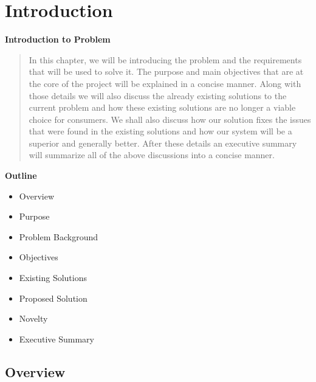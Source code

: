 \section{Introduction}

\vspace{20mm}

\Huge{\textbf{Introduction to Problem}}

\vspace{20mm}


\begin{abstract}
	In this chapter, we will be introducing the problem and the requirements that will be used to solve it. The purpose and main objectives that are at the core of the project will be explained in a concise manner. Along with those details we will also discuss the already existing solutions to the current problem and how these existing solutions are no longer a viable choice for consumers. We shall also discuss how our solution fixes the issues that were found in the existing solutions and how our system will be a superior and generally better. After these details an executive summary will summarize all of the above discussions into a concise manner.
\end{abstract}

\vspace{20mm}






\large{\textbf{Outline}}

\begin{center}
	\begin{itemize}
		\item Overview
		\item Purpose
		\item Problem Background
		\item Objectives
		\item Existing Solutions
		\item Proposed Solution
		\item Novelty
		\item Executive Summary
	\end{itemize}
\end{center}
\pagebreak








\subsection{Overview}


